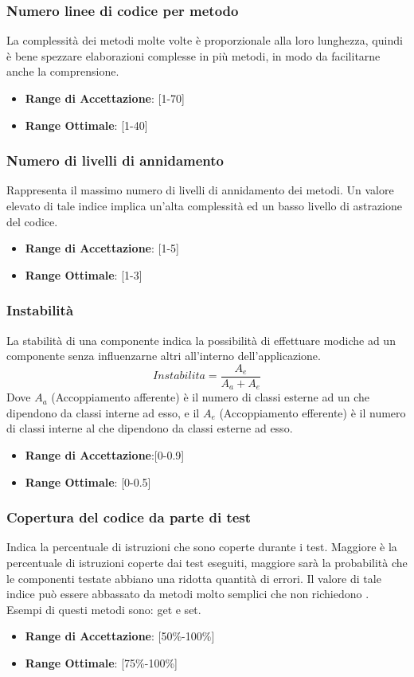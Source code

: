 \documentclass[12pt,a4paper]{article}
\begin{document}
\subsubsection{Numero linee di codice per metodo}
La complessità dei metodi molte volte è proporzionale alla loro lunghezza,
quindi è bene spezzare elaborazioni complesse in più metodi, in modo da facilitarne anche la comprensione.
\begin{itemize}
\item \textbf{Range di Accettazione}: [1-70]
\item \textbf{Range Ottimale}: [1-40]
\end{itemize}
\subsubsection{Numero di livelli di annidamento}
Rappresenta il massimo numero di livelli di annidamento dei metodi. Un valore elevato di tale indice implica un'alta complessità ed un basso livello di astrazione del codice.
\begin{itemize}
\item \textbf{Range di Accettazione}: [1-5]
\item \textbf{Range Ottimale}: [1-3]
\end{itemize}
\subsubsection{Instabilità}
La stabilità di una componente indica la possibilità di effettuare modiche ad un componente senza influenzarne altri all'interno dell'applicazione.
\[Instabilita=\frac{A_e}{A_a+A_e}\]
Dove $A_a$ (Accoppiamento afferente) è il numero di classi esterne ad un  che dipendono da classi interne ad esso, e il $A_e$ (Accoppiamento efferente) è il numero di classi interne al  che dipendono da classi esterne ad esso.
\begin{itemize}
\item \textbf{Range di Accettazione}:[0-0.9]
\item \textbf{Range Ottimale}: [0-0.5]
\end{itemize}
\subsubsection{Copertura del codice da parte di test}
Indica la percentuale di istruzioni che sono coperte durante i test. Maggiore è la percentuale di istruzioni coperte dai test eseguiti, maggiore sarà la probabilità che le componenti testate abbiano una ridotta quantità di errori. Il valore di tale indice può essere abbassato da metodi molto semplici che non richiedono . Esempi di questi metodi sono: get e set.
\begin{itemize}
\item \textbf{Range di Accettazione}: [50\%-100\%]
\item \textbf{Range Ottimale}: [75\%-100\%]
\end{itemize}
\end{document}
